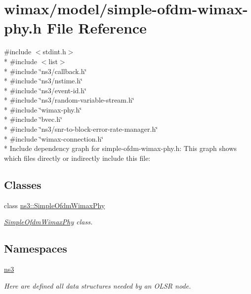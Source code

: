 \hypertarget{simple-ofdm-wimax-phy_8h}{}\section{wimax/model/simple-\/ofdm-\/wimax-\/phy.h File Reference}
\label{simple-ofdm-wimax-phy_8h}
{\ttfamily \#include $<$stdint.\+h$>$}\\*
{\ttfamily \#include $<$list$>$}\\*
{\ttfamily \#include \char`\"{}ns3/callback.\+h\char`\"{}}\\*
{\ttfamily \#include \char`\"{}ns3/nstime.\+h\char`\"{}}\\*
{\ttfamily \#include \char`\"{}ns3/event-\/id.\+h\char`\"{}}\\*
{\ttfamily \#include \char`\"{}ns3/random-\/variable-\/stream.\+h\char`\"{}}\\*
{\ttfamily \#include \char`\"{}wimax-\/phy.\+h\char`\"{}}\\*
{\ttfamily \#include \char`\"{}bvec.\+h\char`\"{}}\\*
{\ttfamily \#include \char`\"{}ns3/snr-\/to-\/block-\/error-\/rate-\/manager.\+h\char`\"{}}\\*
{\ttfamily \#include \char`\"{}wimax-\/connection.\+h\char`\"{}}\\*
Include dependency graph for simple-\/ofdm-\/wimax-\/phy.h\+:
This graph shows which files directly or indirectly include this file\+:
\subsection*{Classes}
\begin{DoxyCompactItemize}
\item 
class \hyperlink{classns3_1_1SimpleOfdmWimaxPhy}{ns3\+::\+Simple\+Ofdm\+Wimax\+Phy}
\begin{DoxyCompactList}\small\item\em \hyperlink{classns3_1_1SimpleOfdmWimaxPhy}{Simple\+Ofdm\+Wimax\+Phy} class. \end{DoxyCompactList}\end{DoxyCompactItemize}
\subsection*{Namespaces}
\begin{DoxyCompactItemize}
\item 
 \hyperlink{namespacens3}{ns3}
\begin{DoxyCompactList}\small\item\em Here are defined all data structures needed by an O\+L\+SR node. \end{DoxyCompactList}\end{DoxyCompactItemize}
